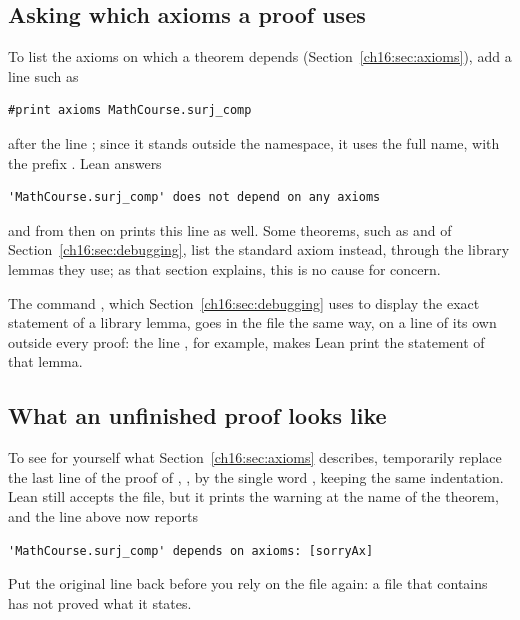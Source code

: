 \subsection*{Asking which axioms a proof uses}
To list the axioms on which a theorem depends (Section~\ref{ch16:sec:axioms}), add a line such as
\par\noindent\begin{minipage}{\linewidth}
\begin{lstlisting}
#print axioms MathCourse.surj_comp
\end{lstlisting}
\end{minipage}\par
after the line ; since it stands outside the namespace, it uses the full name, with the prefix . Lean answers
\par\noindent\begin{minipage}{\linewidth}
\begin{lstlisting}
'MathCourse.surj_comp' does not depend on any axioms
\end{lstlisting}
\end{minipage}\par
and from then on  prints this line as well. Some theorems, such as  and  of Section~\ref{ch16:sec:debugging}, list the standard axiom  instead, through the library lemmas they use; as that section explains, this is no cause for concern.

The command , which Section~\ref{ch16:sec:debugging} uses to display the exact statement of a library lemma, goes in the file the same way, on a line of its own outside every proof: the line , for example, makes Lean print the statement of that lemma.

\subsection*{What an unfinished proof looks like}
To see for yourself what Section~\ref{ch16:sec:axioms} describes, temporarily replace the last line of the proof of , , by the single word , keeping the same indentation. Lean still accepts the file, but it prints the warning  at the name of the theorem, and the  line above now reports
\par\noindent\begin{minipage}{\linewidth}
\begin{lstlisting}
'MathCourse.surj_comp' depends on axioms: [sorryAx]
\end{lstlisting}
\end{minipage}\par
Put the original line back before you rely on the file again: a file that contains  has not proved what it states.

